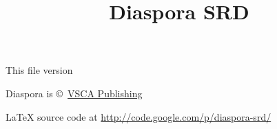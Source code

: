 \documentclass[10pt,letterpaper]{memoir}
\title{Diaspora SRD}
\begin{document}
\frontmatter
\maketitle

{
\thispagestyle{empty}
\vfill
\footnoterule
\footnotesize
This file version \LONGVERSION

Diaspora is \copyright~\href{http://www.vsca.ca/Diaspora}{VSCA Publishing}

\LaTeX{} source code at \url{http://code.google.com/p/diaspora-srd/}
}

\clearpage
\tableofcontents


\mainmatter











\backmatter

\cleardoublepage
\printindex


\end{document}
